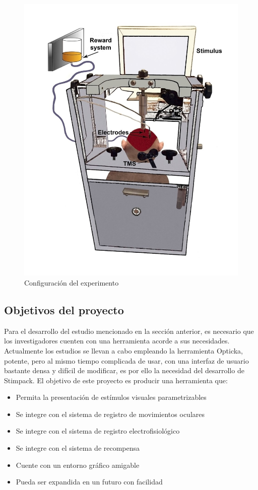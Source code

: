 \documentclass[conference]{IEEEtran}
\begin{document}
\begin{figure}[htbp]
\centerline{\includegraphics[width=\linewidth]{figures/mono}}
\caption{Configuración del experimento}
\label{figMono}
\end{figure}
\subsection{Objetivos del proyecto}

Para el desarrollo del estudio mencionado en la sección anterior, es necesario que los investigadores cuenten con una herramienta acorde a sus necesidades. Actualmente los estudios se llevan a cabo empleando la herramienta Opticka, potente, pero al mismo tiempo complicada de usar, con una interfaz de usuario bastante densa y difícil de modificar, es por ello la necesidad del desarrollo de Stimpack.
El objetivo de este proyecto es producir una herramienta que:

\begin{itemize}
	
	\item Permita la presentación de estímulos visuales parametrizables
	\item Se integre con el sistema de registro de movimientos oculares
	\item Se integre con el sistema de registro electrofisiológico
	\item Se integre con el sistema de recompensa
	\item Cuente con un entorno gráfico amigable
	\item Pueda ser expandida en un futuro con facilidad
\end{itemize}
\end{document}

